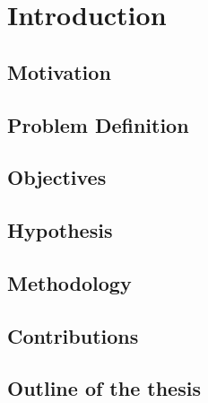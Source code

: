 \chapter{Introduction}
\label{ch:Introduction}


\section{Motivation}
\label{sec:Motivation}


\section{Problem Definition}
\label{sec:Problem}


\section{Objectives}
\label{sec:Objectives}


\section{Hypothesis}
\label{sec:Hypothesis}


\section{Methodology}
\label{sec:Methodology}


\section{Contributions}
\label{sec:Contributions}


\section{Outline of the thesis}
\label{sec:Outline}


\begin{comment}
\section{Summary}
We defined the problem of this thesis as segmenting mammograms automatically.
Breast cancer diagnosis and breast cancer segmentation is important because of this and this. The hypothesis of this work is that and that
\end{comment}

